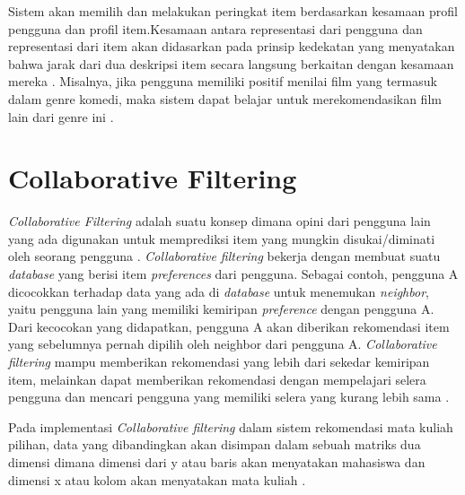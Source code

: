 Sistem akan memilih dan melakukan peringkat item berdasarkan kesamaan profil pengguna dan profil item.Kesamaan antara representasi dari pengguna dan representasi dari
item akan didasarkan pada prinsip kedekatan yang menyatakan bahwa jarak dari dua deskripsi item secara langsung berkaitan dengan kesamaan mereka \citep{rekomendasiTanaman}.
Misalnya, jika pengguna memiliki positif menilai film yang termasuk dalam genre komedi, maka sistem dapat belajar untuk
merekomendasikan film lain dari genre ini \citep{handbook}.


\section{Collaborative Filtering}
\emph{Collaborative Filtering} adalah suatu konsep dimana opini dari pengguna lain yang ada digunakan untuk memprediksi item yang mungkin disukai/diminati oleh seorang pengguna \citep{handbook}.
\emph{Collaborative filtering} bekerja dengan membuat suatu \emph{database} yang berisi item \emph{preferences} dari pengguna. Sebagai contoh, pengguna A dicocokkan terhadap data yang ada di \emph{database} untuk menemukan
\emph{neighbor}, yaitu pengguna lain yang memiliki kemiripan \emph{preference} dengan pengguna A. Dari kecocokan yang didapatkan, pengguna A akan diberikan rekomendasi item yang sebelumnya pernah dipilih oleh neighbor dari
pengguna A. \emph{Collaborative filtering} mampu memberikan rekomendasi yang lebih dari sekedar kemiripan item, melainkan dapat memberikan rekomendasi dengan mempelajari selera pengguna dan mencari pengguna yang memiliki selera yang kurang lebih sama \citep{contentBasedXCollaborative}.

Pada implementasi \emph{Collaborative filtering} dalam sistem rekomendasi mata kuliah pilihan, data yang dibandingkan akan disimpan dalam sebuah matriks dua dimensi dimana dimensi dari y atau baris akan menyatakan mahasiswa dan dimensi x atau kolom akan menyatakan mata kuliah
\citep{cosineSimilarity}.